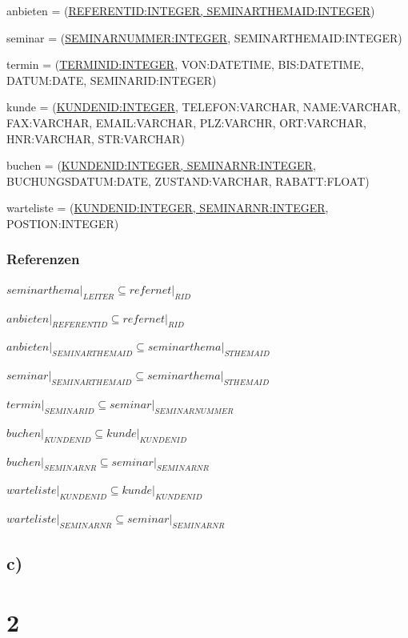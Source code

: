 \documentclass[10pt,a4paper]{report}
\begin{document}
anbieten = (\underline{REFERENTID:INTEGER, SEMINARTHEMAID:INTEGER})

seminar = (\underline{SEMINARNUMMER:INTEGER}, SEMINARTHEMAID:INTEGER)

termin = (\underline{TERMINID:INTEGER}, VON:DATETIME, BIS:DATETIME, DATUM:DATE, SEMINARID:INTEGER)

kunde   = (\underline{KUNDENID:INTEGER}, TELEFON:VARCHAR, NAME:VARCHAR, FAX:VARCHAR, EMAIL:VARCHAR, PLZ:VARCHR, ORT:VARCHAR, HNR:VARCHAR, STR:VARCHAR)

buchen = (\underline{KUNDENID:INTEGER, SEMINARNR:INTEGER}, BUCHUNGSDATUM:DATE, ZUSTAND:VARCHAR, RABATT:FLOAT)

warteliste = (\underline{KUNDENID:INTEGER, SEMINARNR:INTEGER}, POSTION:INTEGER)

\subsubsection{Referenzen}
$seminarthema\vert_{LEITER} \subseteq refernet\vert_{RID}$

$anbieten\vert_{REFERENTID} \subseteq refernet\vert_{RID}$

$anbieten\vert_{SEMINARTHEMAID} \subseteq seminarthema\vert_{STHEMAID}$

$seminar\vert_{SEMINARTHEMAID} \subseteq seminarthema\vert_{STHEMAID}$

$termin\vert_{SEMINARID} \subseteq seminar\vert_{SEMINARNUMMER}$

$buchen\vert_{KUNDENID} \subseteq kunde\vert_{KUNDENID}$

$buchen\vert_{SEMINARNR} \subseteq seminar\vert_{SEMINARNR}$

$warteliste\vert_{KUNDENID} \subseteq kunde\vert_{KUNDENID}$

$warteliste\vert_{SEMINARNR} \subseteq seminar\vert_{SEMINARNR}$

\subsection{c)}



\section{2}

\end{document}
